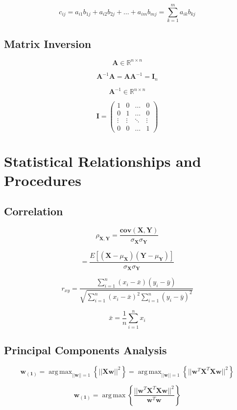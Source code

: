 \documentclass[a4paper]{article}
\DeclareMathOperator*{\argmax}{arg\,max}
\begin{document}
$$ c_{ij} = a_{i1}b_{1j} + a_{i2}b_{2j} + \ldots + a_{im}b_{mj} = \sum_{k=1}^{m}a_{ik}b_{kj} $$

\subsection{Matrix Inversion}

$$ \mathbf{A} \in \mathbb{R}^{n \times n} $$

$$ \mathbf{A}^{-1}\mathbf{A} = \mathbf{AA}^{-1} = \mathbf{I}_n $$

$$ \mathbf{A}^{-1} \in \mathbb{R}^{n \times n} $$

$$ \mathbf{I} = 
\begin{pmatrix}
1 & 0 & \ldots & 0 \\
0 & 1 & \ldots & 0 \\
\vdots & \vdots & \ddots & \vdots \\
0 & 0 & \ldots & 1
\end{pmatrix}
$$

\section{Statistical Relationships and Procedures}

\subsection{Correlation}

$$ \rho_{\mathbf{X}, \mathbf{Y}} = \frac{\mathbf{cov}(\mathbf{X}, \mathbf{Y})}{\sigma_{\mathbf{X}}\sigma_{\mathbf{Y}}} $$

$$ = \frac{E[(\mathbf{X}-\mu_{\mathbf{X}})(\mathbf{Y}-\mu_{\mathbf{Y}})]}{\sigma_{\mathbf{X}}\sigma_{\mathbf{Y}}} $$

$$ r_{xy} = \frac{\sum_{i=1}^{n}(x_i-\bar{x})(y_i-\bar{y})}
{\sqrt{
\sum_{i=1}^{n}(x_i-\bar{x})^2
\sum_{i=1}^{n}(y_i-\bar{y})^2
}} $$

$$ \bar{x} = \frac{1}{n}\sum_{i=1}^{n}x_i $$

\subsection{Principal Components Analysis}

$$ \mathbf{w_{(1)}} = \argmax_{||\mathbf{w}||=1}\left\{ ||\mathbf{Xw}||^2 \right\} = \argmax_{||\mathbf{w}||=1}\left\{ ||\mathbf{w}^T\mathbf{X}^T\mathbf{Xw}||^2 \right\}$$

$$ \mathbf{w_{(1)}}=\argmax\left\{\frac{||\mathbf{w}^T\mathbf{X}^T\mathbf{Xw}||^2}{\mathbf{w}^T\mathbf{w}}\right\}$$
\end{document}
